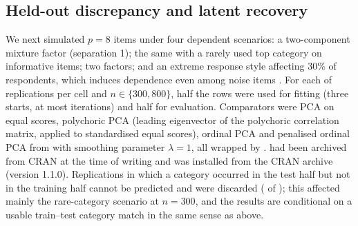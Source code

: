 \begin{table}[htbp]
\centering\small
{}
\caption{Power of the held-out permutation test at level 0.05 under weak dependence ($n=300$, half used for fitting), by loading multiplier $c$.}
\label{tab:power}
\end{table}

\subsection{Held-out discrepancy and latent recovery}
We next simulated $p=8$ items under four dependent scenarios: a two-component mixture factor (separation 1); the same with a rarely used top category on informative items; two factors; and an extreme response style affecting 30\% of respondents, which induces dependence even among noise items \citep{baumgartner2001}. For each of \benchReps{} replications per cell and $n\in\{300,800\}$, half the rows were used for fitting (three starts, at most \benchMaxit{} iterations) and half for evaluation. Comparators were PCA on equal scores, polychoric PCA (leading eigenvector of the polychoric correlation matrix, applied to standardised equal scores), ordinal  PCA and penalised ordinal PCA from  with smoothing parameter $\lambda=1$, all wrapped by .  had been archived from CRAN at the time of writing and was installed from the CRAN archive (version 1.1.0). Replications in which a category occurred in the test half but not in the training half cannot be predicted and were discarded (\benchLost{} of \benchCells{}); this affected mainly the rare-category scenario at $n=300$, and the results are conditional on a usable train--test category match in the same sense as above.

